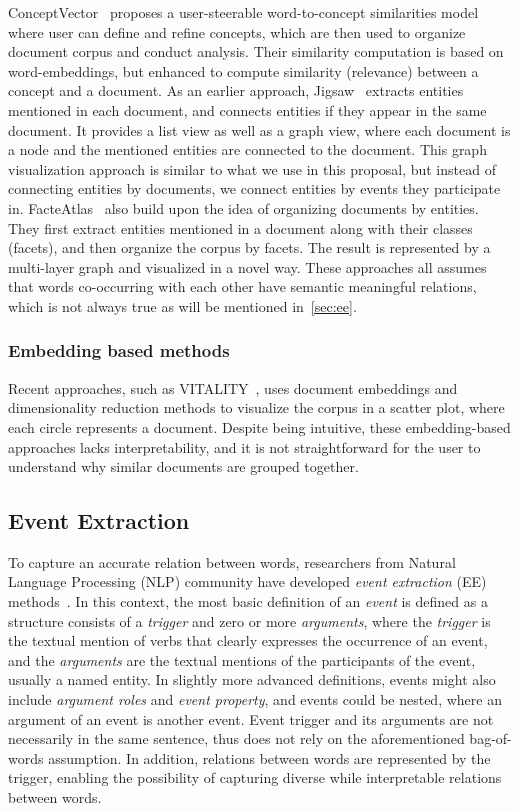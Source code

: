 ConceptVector~\cite{park2017conceptvector} proposes a user-steerable word-to-concept similarities model where user can define and refine concepts, which are then used to organize document corpus and conduct analysis.
Their similarity computation is based on word-embeddings, but enhanced to compute similarity (relevance) between a concept and a document.
As an earlier approach, Jigsaw~\cite{stasko2007jigsaw} extracts entities mentioned in each document, and connects entities if they appear in the same document.
It provides a list view as well as a graph view, where each document is a node and the mentioned entities are connected to the document.
This graph visualization approach is similar to what we use in this proposal, but instead of connecting entities by documents, we connect entities by events they participate in.
FacteAtlas~\cite{cao2010facetatlas} also build upon the idea of organizing documents by entities.
They first extract entities mentioned in a document along with their classes (facets), and then organize the corpus by facets. 
The result is represented by a multi-layer graph and visualized in a novel way.
These approaches all assumes that words co-occurring with each other have semantic meaningful relations, which is not always true as will be mentioned in~\autoref{sec:ee}.

\subsubsection{Embedding based methods}
Recent approaches, such as VITALITY~\cite{Narechania2022VITALITY}, uses document embeddings and dimensionality reduction methods to visualize the corpus in a scatter plot, where each circle represents a document.
Despite being intuitive, these embedding-based approaches lacks interpretability, and it is not straightforward for the user to understand why similar documents are grouped together.

\subsection{Event Extraction}\label{sec:ee}
To capture an accurate relation between words, researchers from Natural Language Processing (NLP) community have developed \textit{event extraction} (EE) methods~\cite{EESurveyBiomed}.
In this context, the most basic definition of an \textit{event} is defined as a structure consists of a \textit{trigger} and zero or more \textit{arguments},
where the \textit{trigger} is the textual mention of verbs that clearly expresses the occurrence of an event,
and the \textit{arguments} are the textual mentions of the participants of the event, usually a named entity.
In slightly more advanced definitions, events might also include \textit{argument roles} and \textit{event property}, and events could be nested, where an argument of an event is another event.
Event trigger and its arguments are not necessarily in the same sentence, thus does not rely on the aforementioned bag-of-words assumption.
In addition, relations between words are represented by the trigger, enabling the possibility of capturing diverse while interpretable relations between words.

